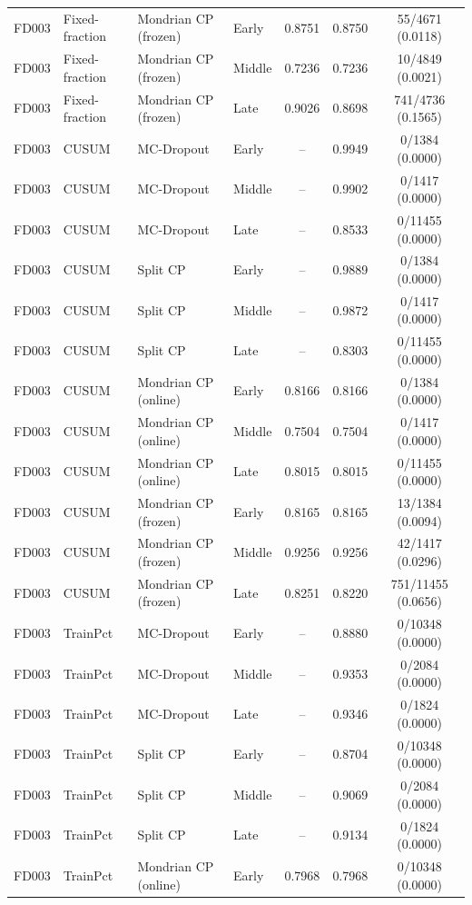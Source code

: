 \begin{table}[t]
\begin{tabular}{llllccc}
FD003 & Fixed-fraction & Mondrian CP (frozen) & Early & 0.8751 & 0.8750 & 55/4671 (0.0118) \\
FD003 & Fixed-fraction & Mondrian CP (frozen) & Middle & 0.7236 & 0.7236 & 10/4849 (0.0021) \\
FD003 & Fixed-fraction & Mondrian CP (frozen) & Late & 0.9026 & 0.8698 & 741/4736 (0.1565) \\
FD003 & CUSUM & MC-Dropout & Early & -- & 0.9949 & 0/1384 (0.0000) \\
FD003 & CUSUM & MC-Dropout & Middle & -- & 0.9902 & 0/1417 (0.0000) \\
FD003 & CUSUM & MC-Dropout & Late & -- & 0.8533 & 0/11455 (0.0000) \\
FD003 & CUSUM & Split CP & Early & -- & 0.9889 & 0/1384 (0.0000) \\
FD003 & CUSUM & Split CP & Middle & -- & 0.9872 & 0/1417 (0.0000) \\
FD003 & CUSUM & Split CP & Late & -- & 0.8303 & 0/11455 (0.0000) \\
FD003 & CUSUM & Mondrian CP (online) & Early & 0.8166 & 0.8166 & 0/1384 (0.0000) \\
FD003 & CUSUM & Mondrian CP (online) & Middle & 0.7504 & 0.7504 & 0/1417 (0.0000) \\
FD003 & CUSUM & Mondrian CP (online) & Late & 0.8015 & 0.8015 & 0/11455 (0.0000) \\
FD003 & CUSUM & Mondrian CP (frozen) & Early & 0.8165 & 0.8165 & 13/1384 (0.0094) \\
FD003 & CUSUM & Mondrian CP (frozen) & Middle & 0.9256 & 0.9256 & 42/1417 (0.0296) \\
FD003 & CUSUM & Mondrian CP (frozen) & Late & 0.8251 & 0.8220 & 751/11455 (0.0656) \\
FD003 & TrainPct & MC-Dropout & Early & -- & 0.8880 & 0/10348 (0.0000) \\
FD003 & TrainPct & MC-Dropout & Middle & -- & 0.9353 & 0/2084 (0.0000) \\
FD003 & TrainPct & MC-Dropout & Late & -- & 0.9346 & 0/1824 (0.0000) \\
FD003 & TrainPct & Split CP & Early & -- & 0.8704 & 0/10348 (0.0000) \\
FD003 & TrainPct & Split CP & Middle & -- & 0.9069 & 0/2084 (0.0000) \\
FD003 & TrainPct & Split CP & Late & -- & 0.9134 & 0/1824 (0.0000) \\
FD003 & TrainPct & Mondrian CP (online) & Early & 0.7968 & 0.7968 & 0/10348 (0.0000) \\

\end{tabular}
\end{table}
